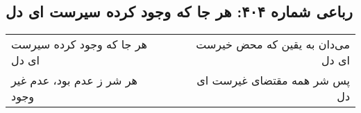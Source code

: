\begin{center}
\section*{رباعی شماره ۴۰۴: هر جا که وجود کرده سیرست ای دل}
\label{sec:sh404}
\begin{longtable}{l p{0.5cm} r}
هر جا که وجود کرده سیرست ای دل
&&
می‌دان به یقین که محض خیرست ای دل
\\
هر شر ز عدم بود، عدم غیر وجود
&&
پس شر همه مقتضای غیرست ای دل
\\
\end{longtable}
\end{center}
